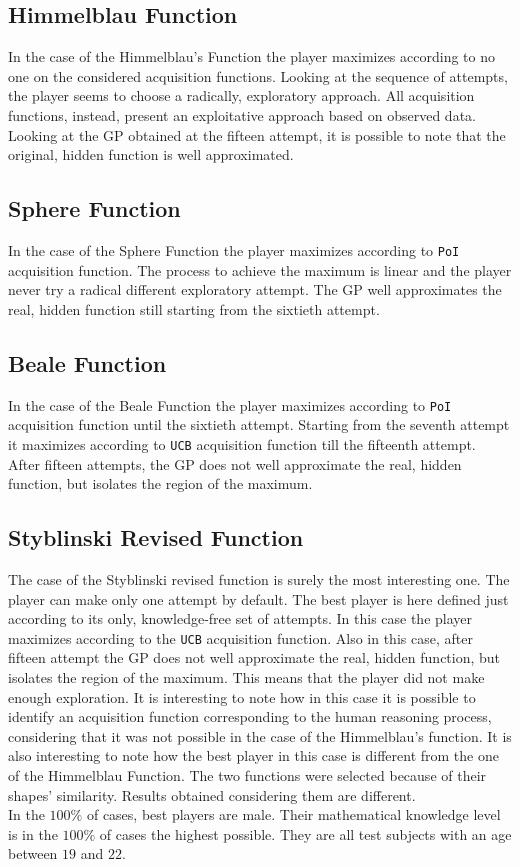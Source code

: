 \subsection{Himmelblau Function}
In the case of the Himmelblau's Function the player maximizes according to no one on the considered acquisition functions. Looking at the sequence of attempts, the player seems to choose a radically, exploratory approach. All acquisition functions, instead, present an exploitative approach based on observed data. Looking at the GP obtained at the fifteen attempt, it is possible to note that the original, hidden function is well approximated.

\subsection{Sphere Function}
In the case of the Sphere Function the player maximizes according to {\tt PoI} acquisition function. The process to achieve the maximum is linear and the player never try a radical different exploratory attempt. The GP well approximates the real, hidden function still starting from the sixtieth attempt.

\subsection{Beale Function}
In the case of the Beale Function the player maximizes according to {\tt PoI} acquisition function until the sixtieth attempt. Starting from the seventh attempt it maximizes according to {\tt UCB} acquisition function till the fifteenth attempt. After fifteen attempts, the GP does not well approximate the real, hidden function, but isolates the region of the maximum.


\subsection{Styblinski Revised Function}
The case of the Styblinski revised function is surely the most interesting one. The player can make only one attempt by default. The best player is here defined just according to its only, knowledge-free set of attempts. In this case the player maximizes according to the {\tt UCB} acquisition function. Also in this case, after fifteen attempt the GP does not well approximate the real, hidden function, but isolates the region of the maximum. This means that the player did not make enough exploration. It is interesting to note how in this case it is possible to identify an acquisition function corresponding to the human reasoning process, considering that it was not possible in the case of the Himmelblau's function. It is also interesting to note how the best player in this case is different from the one of the Himmelblau Function. The two functions were selected because of their shapes' similarity. Results obtained considering them are different. \\

In the $100\%$ of cases, best players are male. Their mathematical knowledge level is in the $100\%$ of cases the highest possible. They are all test subjects with an age between $19$ and $22$.



